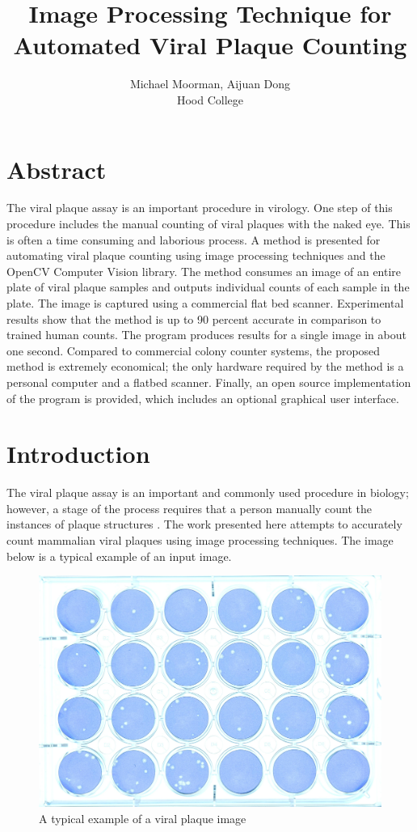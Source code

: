 \documentclass[11pt,final,twocolumn]{IEEEtran}
\begin{document}
\title{Image Processing Technique for Automated Viral Plaque Counting}
\author{Michael Moorman, Aijuan Dong \\
Hood College}
\maketitle
\section{Abstract}
The viral plaque assay is an important procedure in virology. One step of this procedure includes the manual counting of viral plaques with the naked eye.  This is often a time consuming and laborious process. A method is presented for automating viral plaque counting using image processing techniques and the OpenCV Computer Vision library. The method consumes an image of an entire plate of viral plaque samples and outputs individual counts of each sample in the plate. The image is captured using a commercial flat bed scanner. Experimental results show that the method is up to 90 percent accurate in comparison to trained human counts. The program produces results for a single image in about one second.  Compared to commercial colony counter systems, the proposed method is extremely economical; the only hardware required by the method is a personal computer and a flatbed scanner.  Finally, an open source implementation of the program is provided, which includes an optional graphical user interface. 


\section{Introduction}
The viral plaque assay is an important and commonly used procedure in biology; however, a stage of the process requires that a person manually count the instances of plaque structures . The work presented here attempts to accurately count mammalian  viral plaques using image processing techniques. The image below is a typical example of an input image.
\begin{figure}[h]
\centering
\includegraphics[width=.4\textwidth]{sample.jpg}
\caption{A typical example of a viral plaque image}
\label{fig:sample}
\end{figure}
\end{document}
